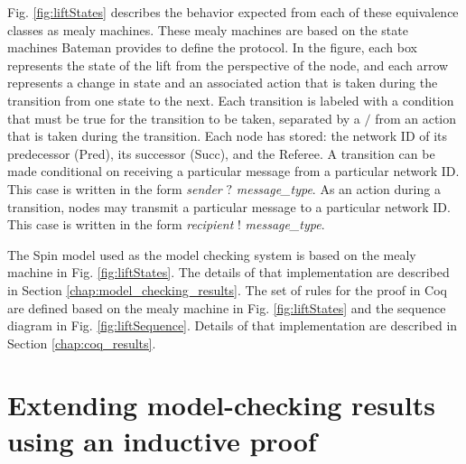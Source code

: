 \documentclass[runningheads]{llncs}
\newif\ifcomments
\newcommand{\egm}[1]{\ifcomments\textcolor{orange}{egm: #1}\fi}
\begin{document}
Fig. \ref{fig:liftStates} describes the behavior expected from each of these equivalence classes as mealy machines.
These mealy machines are based on the state machines Bateman provides to define the protocol. \cite{bateman_state_machines} 
In the figure, each box represents the state of the lift from the perspective of the node, and each arrow represents a change in state and an associated action that is taken during the transition from one state to the next. Each transition is labeled with a condition that must be true for the transition to be taken, separated by a $/$ from an action that is taken during the transition. Each node has stored: the network ID of its predecessor (Pred), its successor (Succ), and the Referee. A transition can be made conditional on receiving a particular message from a particular network ID. This case is written in the form \emph{sender} $?$ \emph{message\_type}. As an action during a transition, nodes may transmit a particular message to a particular network ID. This case is written in the form \emph{recipient} $!$ \emph{message\_type}. 

The Spin model used as the model checking system is based on the mealy machine in Fig. \ref{fig:liftStates}. The details of that implementation are described in Section \ref{chap:model_checking_results}. The set of rules for the proof in Coq are defined based on the mealy machine in Fig. \ref{fig:liftStates} and the sequence diagram in 
 Fig. \ref{fig:liftSequence}. Details of that implementation are described in Section \ref{chap:coq_results}.
 
\section{Extending model-checking results using an inductive proof}
\label{sec:extending}

\egm{Great first draft. State the result as a theorem in a theorem environment. State each condition as either lemmas or theorems. and not a condition. These are admitted without any explanation beyond what they mean. Also, state condition 2 in terms of conformance. Be sure to define the base system very clearly. Push detailed items relative to conformance to the Coq model section since it needs a strong tie to conformance. Here just define it's meaning intuitively. So this sections should state the theorems/lemmas, and then manually prove that top-level theorem. I would expect an actual manual proof ending with QED. It should not be too hard since you have the lemmas/theorems that you need already admitted. For conditions (2) relative to the blackbox verification, make it its own section with the best argument you can and push the rest to future work.}
\end{document}
